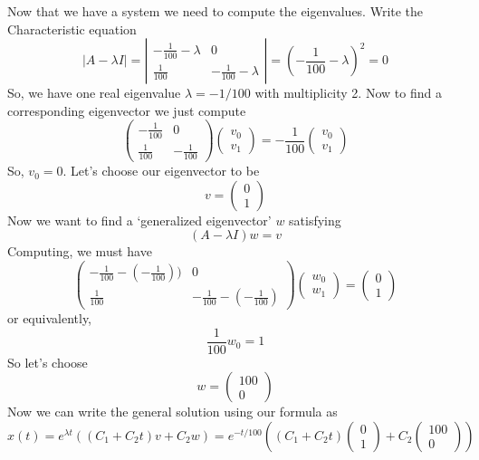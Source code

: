 \documentclass[11pt]{article}
\begin{document}
Now that we have a system we need to compute the eigenvalues. Write the Characteristic equation
\[ | A - \lambda I  | = \left| \begin{array}{cc} - \frac{1}{100} - \lambda& 0 \\ \frac{1}{100} & - \frac{1}{100} - \lambda \end{array} \right|  =  \left( - \frac{1}{100} - \lambda \right) ^2 = 0\]
So, we have one real eigenvalue $\lambda = -1/100$ with multiplicity 2. Now to find a corresponding eigenvector we just compute
\[ \left( \begin{array}{cc} - \frac{1}{100} & 0 \\ \frac{1}{100} & - \frac{1}{100} \end{array} \right)  \left( \begin{array}{c} v_0 \\ v_1 \end{array} \right)  = -\frac{1}{100} \left( \begin{array}{c} v_0 \\  v_1 \end{array} \right)\]
So, $v_0 = 0$. Let's choose our eigenvector to be
\[v = \left( \begin{array}{c} 0 \\ 1 \end{array} \right)\]
Now we want to find a `generalized eigenvector' $w$ satisfying
\[(A - \lambda I ) w = v\]
Computing, we must have
\[   \left( \begin{array}{cc} - \frac{1}{100} - (- \frac{1}{100}))& 0 \\ \frac{1}{100} & - \frac{1}{100} - (- \frac{1}{100}) \end{array} \right)  \left( \begin{array}{c} w_0 \\ w_1 \end{array} \right) =  \left( \begin{array}{c} 0 \\ 1 \end{array} \right)\]
or equivalently,
\[\frac{1}{100} w_0 = 1\]
So let's choose 
\[w = \left( \begin{array}{c}100\\ 0 \end{array} \right)\]
Now we can write the general solution using our formula as
\[x(t) = e^{\lambda t} \left( ( C_1 + C_2 t) v   + C_2  w \right) = e^{-  t / 100} \left( ( C_1 + C_2 t)  \left( \begin{array}{c}0\\ 1 \end{array} \right)  + C_2  \left( \begin{array}{c}100\\ 0 \end{array} \right) \right)  \]
\end{document}
